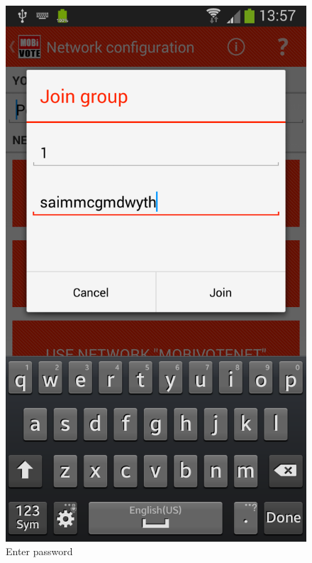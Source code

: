 \documentclass[numbers=noenddot, abstract=on, a4paper, headsepline,
footsepline, oneside, openright, draft=off, listof=leveldown]{scrreprt}
\begin{document}
\begin{figure}[!htb]
\begin{minipage}{.5\textwidth}
		\includegraphics[height=.4\textheight]{img/screenshots/join_electorate_password}
		\caption{Enter password}
		\label{fig:handbook_joinelectoratepassword}
	\end{minipage}
\end{figure}
\end{document}
